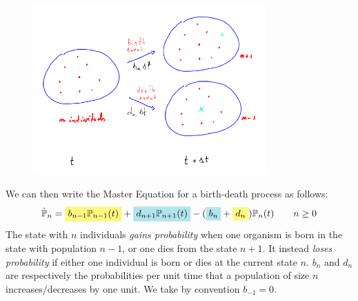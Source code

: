 \documentclass[../../main.tex]{subfiles}
\begin{document}
\begin{figure}[H]
    \centering
    \includegraphics[width=0.8\textwidth]{birth-death-evo.png}
    \caption{} %
    \label{fig:birth-death-evo}
\end{figure}

We can then write the Master Equation for a birth-death process as follows:
\begin{align}\label{eqn:birth-death-ME}
    \dot{\mathbb{P}}_{n} = \hlc{Yellow}{b_{n-1} \mathbb{P}_{n-1}(t)} + \hlc{SkyBlue}{d_{n+1}\mathbb{P}_{n+1}(t) }- (\hlc{SkyBlue}{b_n} +\hlc{Yellow}{ d_n}) \mathbb{P}_n(t) \qquad n\geq 0
\end{align}
The state with $n$ individuals \textit{gains probability} when one organism is born in the state with population $n-1$, or one dies from the state $n+1$. It instead \textit{loses probability} if either one individual is born or dies at the current state $n$. $b_n$ and $d_n$ are respectively the probabilities per unit time that a population of size $n$ increases/decreases by one unit. We take by convention $b_{-1} = 0$.

\medskip
\end{document}
